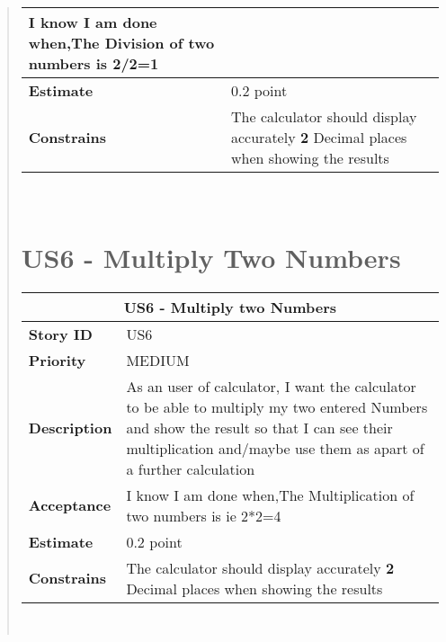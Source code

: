 \documentclass[12pt]{report}
\begin{document}
\begin{quote}
\begin{tabular}{ |p{4cm}|p{10cm}| }
                 I know I am done when,The Division of two numbers is 2/2=1
                
                \\
                 \hline
                 \textbf{Estimate} &  0.2  point  \\
                 \hline
                 \textbf{Constrains}& The calculator should display accurately \textbf{2} Decimal places when showing the results \\
                 \hline
                \end{tabular}
            \hfill\break\\
            
            
              \section{US6 - Multiply Two Numbers  }
                \begin{tabular}{ |p{4cm}|p{10cm}| }
                 \hline
                 \multicolumn{2}{|c|}{\textbf{US6 - Multiply two Numbers } } \\
                 \hline
                 \textbf {Story ID}& US6  \\
                 \hline
                 \textbf{Priority} & MEDIUM \\
                 \hline
                 \textbf{Description}   & As an user of calculator, I want the  calculator to be able to multiply my two entered Numbers and show the result so that I can see their multiplication and/maybe use them as apart of a further calculation \\
                 \hline
                 \textbf{Acceptance}&
                
                 I know I am done when,The Multiplication of two numbers is ie 2*2=4
                
                \\
                 \hline
                 \textbf{Estimate} &  0.2  point  \\
                 \hline
                 \textbf{Constrains}& The calculator should display accurately \textbf{2} Decimal places when showing the results \\
                 \hline
                \end{tabular}
            \hfill\break\\
            
            

\end{quote}
\end{document}
